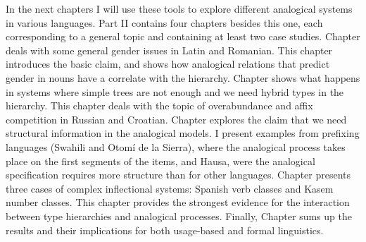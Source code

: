 In the next chapters I will use these tools to explore different analogical systems in various languages. Part II contains four chapters besides this one, each corresponding to a general topic and containing at least two case studies. Chapter  deals with some general gender issues in Latin and Romanian. This chapter introduces the basic claim, and shows how analogical relations that predict gender in nouns have a correlate with the hierarchy. Chapter  shows what happens in systems where simple trees are not enough and we need hybrid types in the hierarchy. This chapter deals with the topic of overabundance and affix competition in Russian and Croatian. Chapter  explores the claim that we need structural information in the analogical models. I present examples from prefixing languages (Swahili and Otomí de la Sierra), where the analogical process takes place on the first segments of the items, and Hausa, were the analogical specification requires more structure than for other languages. Chapter  presents three cases of complex inflectional systems: Spanish verb classes and Kasem number classes. This chapter provides the strongest evidence for the interaction between type hierarchies and analogical processes. Finally, Chapter  sums up the results and their implications for both usage-based and formal linguistics.



